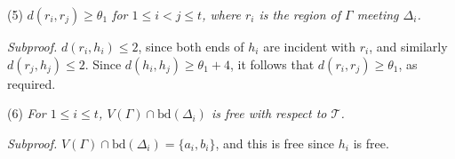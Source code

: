 \hspace*{12pt}(5) \textit{$d(r_i, r_j) \ge \theta_1$ for $1 \le i < j \le t$, where $r_i$ is the region of $\Gamma$ meeting $\Delta_i$.}

\textit{Subproof.} $d(r_i, h_i) \le 2$, since both ends of $h_i$ are incident with $r_i$, and similarly $d(r_j, h_j) \le 2$. Since $d(h_i, h_j) \ge \theta_1 + 4$, it follows that $d(r_i, r_j) \ge \theta_1$, as required.

\hspace*{12pt}(6) \textit{For $1 \le i \le t$, $V(\Gamma) \cap \text{bd}(\Delta_i)$ is free with respect to $\mathscr{T}$.}

\textit{Subproof.} $V(\Gamma) \cap \text{bd}(\Delta_i) = \{a_i, b_i\}$, and this is free since $h_i$ is free.
